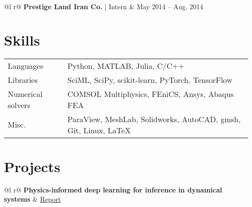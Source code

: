\documentclass[a4paper,11pt]{article}
\begin{document}
\begin{tabularx}{\linewidth}{ @{}l r@{} }
\textbf{Prestige Land Iran Co.} | \small{Intern} & \hfill May 2014 – Aug. 2014 \\[3.75pt]
\end{tabularx}

\section{Skills}
\begin{tabularx}{\linewidth}{@{}l X@{}}
Languages &  \normalsize{Python, MATLAB, Julia, C/C++}\\
Libraries &  \normalsize{SciML, SciPy, scikit-learn, PyTorch, TensorFlow}\\
Numerical solvers &  \normalsize{COMSOL Multiphysics, FEniCS, Ansys, Abaqus FEA}\\  
Misc. &  \normalsize{ParaView, MeshLab, Solidworks, AutoCAD, gmsh, Git, Linux, \LaTeX}\\

\end{tabularx}


\section{Projects}

\begin{tabularx}{\linewidth}{ @{}l r@{} }
\textbf{Physics-informed deep learning for inference in dynamical systems} & \hfill \href{https://drive.google.com/file/d/1ABVhulllwKJmb-b2MjWoaJdsj6STwpX2/view?usp=sharing}{Report} \\[3.75pt]
  \\
\end{tabularx}
\end{document}
